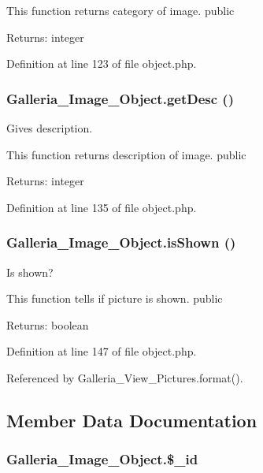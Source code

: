 This function returns category of image.  public \begin{Desc}
\item[Returns:]integer \end{Desc}


Definition at line 123 of file object.php.
\subsubsection{\setlength{\rightskip}{0pt plus 5cm}Galleria\_\-Image\_\-Object.getDesc ()}\label{classGalleria__Image__Object_3951b31e044a949089d560ea6207936f}


Gives description.

This function returns description of image.  public \begin{Desc}
\item[Returns:]integer \end{Desc}


Definition at line 135 of file object.php.
\subsubsection{\setlength{\rightskip}{0pt plus 5cm}Galleria\_\-Image\_\-Object.isShown ()}\label{classGalleria__Image__Object_e22d32e214f3b8566078c02312058f24}


Is shown?

This function tells if picture is shown.  public \begin{Desc}
\item[Returns:]boolean \end{Desc}


Definition at line 147 of file object.php.

Referenced by Galleria\_\-View\_\-Pictures.format().

\subsection{Member Data Documentation}
\subsubsection{\setlength{\rightskip}{0pt plus 5cm}Galleria\_\-Image\_\-Object.\$\_\-id\hspace{0.3cm}{\tt  [protected]}}\label{classGalleria__Image__Object_14176f3b1c614dd8746a7dc946b71b12}




